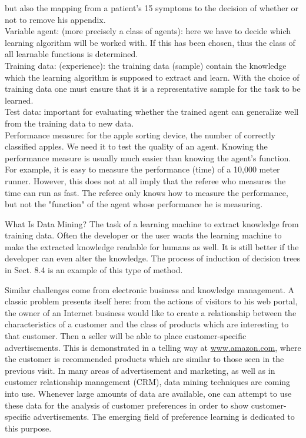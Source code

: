 \documentclass[10pt]{book}
\begin{document}
but also the mapping from a patient's 15 symptoms to the decision of whether or not to remove his appendix.\\
Variable agent: (more precisely a class of agents): here we have to decide which learning algorithm will be worked with. If this has been chosen, thus the class of all learnable functions is determined.\\
Training data: (experience): the training data (sample) contain the knowledge which the learning algorithm is supposed to extract and learn. With the choice of training data one must ensure that it is a representative sample for the task to be learned.\\
Test data: important for evaluating whether the trained agent can generalize well from the training data to new data.\\
Performance measure: for the apple sorting device, the number of correctly classified apples. We need it to test the quality of an agent. Knowing the performance measure is usually much easier than knowing the agent's function. For example, it is easy to measure the performance (time) of a 10,000 meter runner. However, this does not at all imply that the referee who measures the time can run as fast. The referee only knows how to measure the performance, but not the "function" of the agent whose performance he is measuring.

What Is Data Mining? The task of a learning machine to extract knowledge from training data. Often the developer or the user wants the learning machine to make the extracted knowledge readable for humans as well. It is still better if the\\
developer can even alter the knowledge. The process of induction of decision trees in Sect. 8.4 is an example of this type of method.


Similar challenges come from electronic business and knowledge management. A classic problem presents itself here: from the actions of visitors to his web portal, the owner of an Internet business would like to create a relationship between the characteristics of a customer and the class of products which are interesting to that customer. Then a seller will be able to place customer-specific advertisements. This is demonstrated in a telling way at \href{http://www.amazon.com}{www.amazon.com}, where the customer is recommended products which are similar to those seen in the previous visit. In many areas of advertisement and marketing, as well as in customer relationship management (CRM), data mining techniques are coming into use. Whenever large amounts of data are available, one can attempt to use these data for the analysis of customer preferences in order to show customer-specific advertisements. The emerging field of preference learning is dedicated to this purpose.
\end{document}
